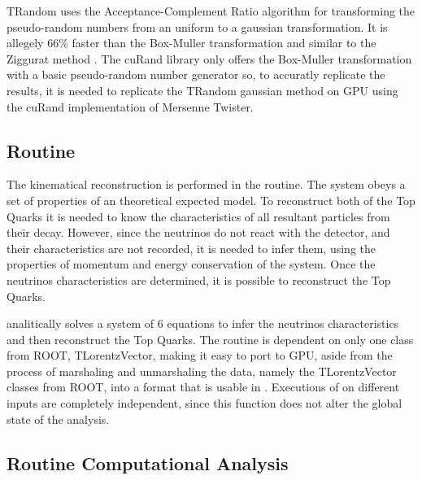 TRandom uses the Acceptance-Complement Ratio algorithm \cite{AcceptanceRandom} for transforming the pseudo-random numbers from an uniform to a gaussian transformation. It is allegely 66\% faster than the Box-Muller transformation \cite{BoxMuller} and similar to the Ziggurat method \cite{Ziggurat}. The cuRand library only offers the Box-Muller transformation with a basic pseudo-random number generator so, to accuratly replicate the results, it is needed to replicate the TRandom gaussian method on GPU using the cuRand implementation of Mersenne Twister.

\subsection{\dilep Routine}
\label{Application:dilep}

The kinematical reconstruction is performed in the \dilep routine. The \ttbar system obeys a set of properties of an theoretical expected model. To reconstruct both of the Top Quarks it is needed to know the characteristics of all resultant particles from their decay. However, since the neutrinos do not react with the detector, and their characteristics are not recorded, it is needed to infer them, using the properties of momentum and energy conservation of the system. Once the neutrinos characteristics are determined, it is possible to reconstruct the Top Quarks.

\dilep analitically solves a system of 6 equations to infer the neutrinos characteristics and then reconstruct the Top Quarks. The routine is dependent on only one class from ROOT, TLorentzVector, making it easy to port to GPU, aside from the process of marshaling and unmarshaling the data, namely the TLorentzVector classes from ROOT, into a format that is usable in \cuda. Executions of \dilep on different inputs are completely independent, since this function does not alter the global state of the \tth analysis.

\subsection{\ttDilepKinFit Routine Computational Analysis}
\label{Application:ttDilepKinFit:Analysis}

